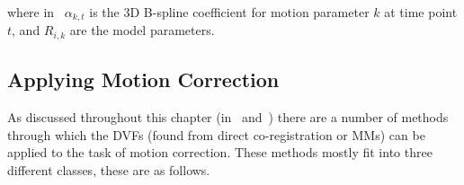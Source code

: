                 \noindent where in~ $\alpha_{k,t}$ is the \gls{3D} B-spline coefficient for motion parameter $k$ at time point $t$, and $R_{i,k}$ are the model parameters.
        
        \subsection{Applying Motion Correction} \label{sec:applying_motion_correction}
            As discussed throughout this chapter (in~ and~) there are a number of methods through which the \glspl{DVF} (found from direct co-registration or \glspl{MM}) can be applied to the task of motion correction. These methods mostly fit into three different classes, these are as follows.
            
